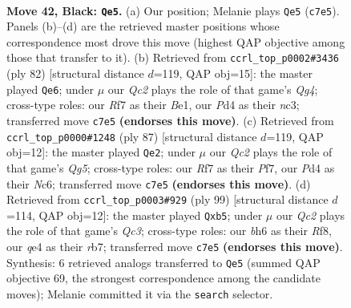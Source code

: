 \documentclass[11pt]{article}
\begin{document}
\clearpage

\begin{figure}[p]\centering
\begin{subfigure}{0.46\textwidth}\centering
\resizebox{\linewidth}{!}{%
\newchessgame
\chessboard[
  setfen={2b1k3/p1qn1r1p/1P3b1B/5P1N/1p1pQ3/8/p3P3/1N1K2R1 b - - 1 42},
  showmover=false,
  pgfstyle=straightmove, color=movearrow, markmove={c7-e5}
]}
\caption{}
\end{subfigure}\hfill
\begin{subfigure}{0.46\textwidth}\centering
\resizebox{\linewidth}{!}{%
\newchessgame
\chessboard[
  setfen={2r5/1q5k/3p2pp/R2Pb3/1P2p1Q1/2n1P1NP/6P1/4B1K1 w - - 5 42},
  showmover=false,
  pgfstyle=straightmove, color=movearrow, markmove={g4-e6}
]}
\caption{}
\end{subfigure}
\\[4pt]
\begin{subfigure}{0.46\textwidth}\centering
\resizebox{\linewidth}{!}{%
\newchessgame
\chessboard[
  setfen={8/5p1k/2n1rPpb/p2Q4/6q1/BN5P/1PP5/1K1R4 b - - 0 44},
  showmover=false,
  pgfstyle=straightmove, color=movearrow, markmove={g4-e2}
]}
\caption{}
\end{subfigure}\hfill
\begin{subfigure}{0.46\textwidth}\centering
\resizebox{\linewidth}{!}{%
\newchessgame
\chessboard[
  setfen={5rk1/1R6/2q3pp/1Qb1p3/p3Pn2/2P1N2P/5PP1/2N3K1 b - - 3 50},
  showmover=false,
  pgfstyle=straightmove, color=movearrow, markmove={c6-b5}
]}
\caption{}
\end{subfigure}
\caption{\textbf{Move 42, Black: \texttt{Qe5}.} (a) Our position; Melanie plays \texttt{Qe5} (\texttt{c7e5}). Panels (b)--(d) are the retrieved master positions whose correspondence most drove this move (highest QAP objective among those that transfer to it). (b) Retrieved from \texttt{ccrl\_top\_p0002\#3436} (ply 82) [structural distance $d$=119, QAP obj=15]: the master played \texttt{Qe6}; under $\mu$ our \emph{Qc2} plays the role of that game's \emph{Qg4}; cross-type roles: our \emph{R}f7 as their \emph{B}e1, our \emph{P}d4 as their \emph{n}c3; transferred move \texttt{c7e5} \textbf{(endorses this move)}. (c) Retrieved from \texttt{ccrl\_top\_p0000\#1248} (ply 87) [structural distance $d$=119, QAP obj=12]: the master played \texttt{Qe2}; under $\mu$ our \emph{Qc2} plays the role of that game's \emph{Qg5}; cross-type roles: our \emph{R}f7 as their \emph{P}f7, our \emph{P}d4 as their \emph{N}c6; transferred move \texttt{c7e5} \textbf{(endorses this move)}. (d) Retrieved from \texttt{ccrl\_top\_p0003\#929} (ply 99) [structural distance $d$=114, QAP obj=12]: the master played \texttt{Qxb5}; under $\mu$ our \emph{Qc2} plays the role of that game's \emph{Qc3}; cross-type roles: our \emph{b}h6 as their \emph{R}f8, our \emph{q}e4 as their \emph{r}b7; transferred move \texttt{c7e5} \textbf{(endorses this move)}. Synthesis: 6 retrieved analogs transferred to \texttt{Qe5} (summed QAP objective 69, the strongest correspondence among the candidate moves); Melanie committed it via the \texttt{search} selector.}
\label{fig:thought-m83}
\end{figure}
\end{document}
